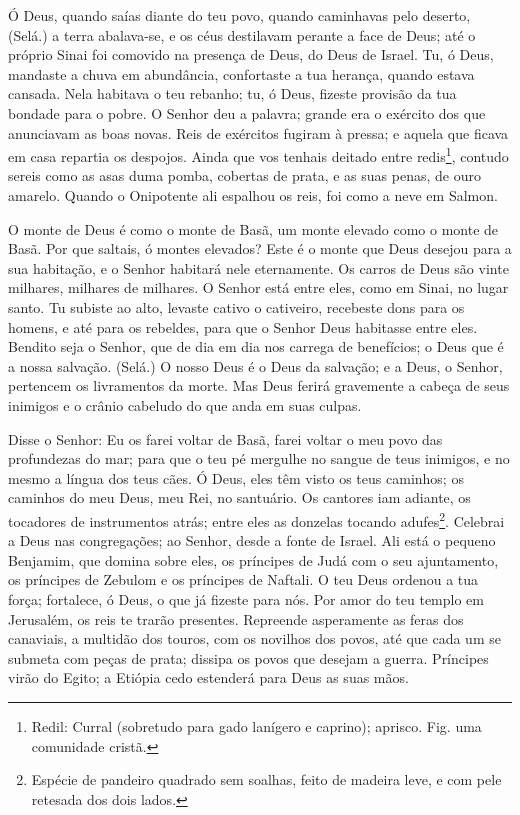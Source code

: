 Ó Deus, quando saías diante do teu povo, quando caminhavas pelo
deserto, (Selá.) a terra abalava-se, e os céus destilavam
perante a face de Deus; até o próprio Sinai foi comovido na presença
de Deus, do Deus de Israel. Tu, ó Deus, mandaste a chuva em
abundância, confortaste a tua herança, quando estava cansada.
Nela habitava o teu rebanho; tu, ó Deus, fizeste provisão da
tua bondade para o pobre. O Senhor deu a palavra; grande era
o exército dos que anunciavam as boas novas. Reis de
exércitos fugiram à pressa; e aquela que ficava em casa repartia os
despojos. Ainda que vos tenhais deitado entre
redis\footnote{Redil: Curral (sobretudo para gado lanígero e
caprino); aprisco. Fig. uma comunidade cristã.}, contudo sereis como
as asas duma pomba, cobertas de prata, e as suas penas, de ouro
amarelo. Quando o Onipotente ali espalhou os reis, foi como a
neve em Salmon.

O monte de Deus é como o monte de Basã, um monte elevado como o
monte de Basã. Por que saltais, ó montes elevados? Este é o
monte que Deus desejou para a sua habitação, e o Senhor habitará
nele eternamente. Os carros de Deus são vinte milhares,
milhares de milhares. O Senhor está entre eles, como em Sinai, no
lugar santo. Tu subiste ao alto, levaste cativo o cativeiro,
recebeste dons para os homens, e até para os rebeldes, para que o
Senhor Deus habitasse entre eles. Bendito seja o Senhor, que
de dia em dia nos carrega de benefícios; o Deus que é a nossa
salvação. (Selá.) O nosso Deus é o Deus da salvação; e a
Deus, o Senhor, pertencem os livramentos da morte. Mas Deus
ferirá gravemente a cabeça de seus inimigos e o crânio cabeludo do
que anda em suas culpas.

Disse o Senhor: Eu os farei voltar de Basã, farei voltar o meu
povo das profundezas do mar; para que o teu pé mergulhe no
sangue de teus inimigos, e no mesmo a língua dos teus cães. Ó
Deus, eles têm visto os teus caminhos; os caminhos do meu Deus, meu
Rei, no santuário. Os cantores iam adiante, os tocadores de
instrumentos atrás; entre eles as donzelas tocando
adufes\footnote{Espécie de pandeiro quadrado sem soalhas, feito de
madeira leve, e com pele retesada dos dois lados.}. Celebrai
a Deus nas congregações; ao Senhor, desde a fonte de Israel.
Ali está o pequeno Benjamim, que domina sobre eles, os
príncipes de Judá com o seu ajuntamento, os príncipes de Zebulom e
os príncipes de Naftali. O teu Deus ordenou a tua força;
fortalece, ó Deus, o que já fizeste para nós. Por amor do teu
templo em Jerusalém, os reis te trarão presentes. Repreende
asperamente as feras dos canaviais, a multidão dos touros, com os
novilhos dos povos, até que cada um se submeta com peças de prata;
dissipa os povos que desejam a guerra. Príncipes virão do
Egito; a Etiópia cedo estenderá para Deus as suas mãos.

